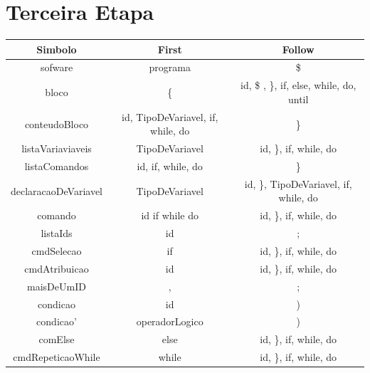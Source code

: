 \documentclass[11pt]{article}
\begin{document}
\section*{Terceira Etapa}

\begin{table}[H]
    \hspace{-3cm}
    \begin{tabular}{c|c|c}
        \hline
        \textbf{Simbolo}     & \textbf{First}                      & \textbf{Follow}  \\
        \hline
        sofware              & programa                            & \$                \\
        \hline
         bloco               & \{                                  & id, \$ , \}, if, else, while, do, until\\
        \hline
        conteudoBloco        & id, TipoDeVariavel, if, while, do   & \}        \\
        \hline
        listaVariaviaveis    & TipoDeVariavel                      & id, \}, if, while, do \\
        \hline
        listaComandos        & id, if, while, do                   & \} \\
        \hline
        declaracaoDeVariavel & TipoDeVariavel                      & id, \}, TipoDeVariavel, if, while, do \\
        \hline
        comando              & id if while do                      & id, \}, if, while, do \\
        \hline
        listaIds             & id                                  & ; \\
        \hline
        cmdSelecao           & if                                  & id, \}, if, while, do\\
        \hline
        cmdAtribuicao        & id                                  & id, \}, if, while, do \\
        \hline
        maisDeUmID           & ,                                   & ; \\
        \hline
        condicao             & id                                  & ) \\
        \hline
        condicao'            & operadorLogico                      & ) \\
        \hline
        comElse              & else                                & id, \}, if, while, do \\
        \hline
        cmdRepeticaoWhile    & while                               & id, \}, if, while, do \\

\end{tabular}
\end{table}
\end{document}
